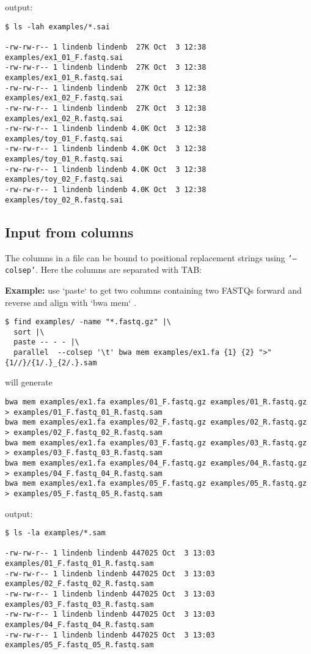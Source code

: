 \documentclass{article}
\newcommand{\example}[1]{
\textbf{Example: } {\color[rgb]{0,0,1} #1 } .
}
\newcommand{\cmdoption}[1]{\texttt{'#1'}}
\begin{document}
output:
\begin{lstlisting}
$ ls -lah examples/*.sai

-rw-rw-r-- 1 lindenb lindenb  27K Oct  3 12:38 examples/ex1_01_F.fastq.sai
-rw-rw-r-- 1 lindenb lindenb  27K Oct  3 12:38 examples/ex1_01_R.fastq.sai
-rw-rw-r-- 1 lindenb lindenb  27K Oct  3 12:38 examples/ex1_02_F.fastq.sai
-rw-rw-r-- 1 lindenb lindenb  27K Oct  3 12:38 examples/ex1_02_R.fastq.sai
-rw-rw-r-- 1 lindenb lindenb 4.0K Oct  3 12:38 examples/toy_01_F.fastq.sai
-rw-rw-r-- 1 lindenb lindenb 4.0K Oct  3 12:38 examples/toy_01_R.fastq.sai
-rw-rw-r-- 1 lindenb lindenb 4.0K Oct  3 12:38 examples/toy_02_F.fastq.sai
-rw-rw-r-- 1 lindenb lindenb 4.0K Oct  3 12:38 examples/toy_02_R.fastq.sai
\end{lstlisting}

\subsection{Input from columns}

The columns in a file can be bound to positional replacement strings using \cmdoption{--colsep}. Here the columns are separated with TAB:

\example{use `paste` to get two columns containing two FASTQs forward and reverse and align with `bwa mem`}
\begin{lstlisting}
$ find examples/ -name "*.fastq.gz" |\
  sort |\
  paste -- - - |\
  parallel  --colsep '\t' bwa mem examples/ex1.fa {1} {2} ">" {1//}/{1/.}_{2/.}.sam
\end{lstlisting}
will generate
\begin{lstlisting}
bwa mem examples/ex1.fa examples/01_F.fastq.gz examples/01_R.fastq.gz > examples/01_F.fastq_01_R.fastq.sam
bwa mem examples/ex1.fa examples/02_F.fastq.gz examples/02_R.fastq.gz > examples/02_F.fastq_02_R.fastq.sam
bwa mem examples/ex1.fa examples/03_F.fastq.gz examples/03_R.fastq.gz > examples/03_F.fastq_03_R.fastq.sam
bwa mem examples/ex1.fa examples/04_F.fastq.gz examples/04_R.fastq.gz > examples/04_F.fastq_04_R.fastq.sam
bwa mem examples/ex1.fa examples/05_F.fastq.gz examples/05_R.fastq.gz > examples/05_F.fastq_05_R.fastq.sam
\end{lstlisting}
output:
\begin{lstlisting}
$ ls -la examples/*.sam

-rw-rw-r-- 1 lindenb lindenb 447025 Oct  3 13:03 examples/01_F.fastq_01_R.fastq.sam
-rw-rw-r-- 1 lindenb lindenb 447025 Oct  3 13:03 examples/02_F.fastq_02_R.fastq.sam
-rw-rw-r-- 1 lindenb lindenb 447025 Oct  3 13:03 examples/03_F.fastq_03_R.fastq.sam
-rw-rw-r-- 1 lindenb lindenb 447025 Oct  3 13:03 examples/04_F.fastq_04_R.fastq.sam
-rw-rw-r-- 1 lindenb lindenb 447025 Oct  3 13:03 examples/05_F.fastq_05_R.fastq.sam
\end{lstlisting}
\end{document}
